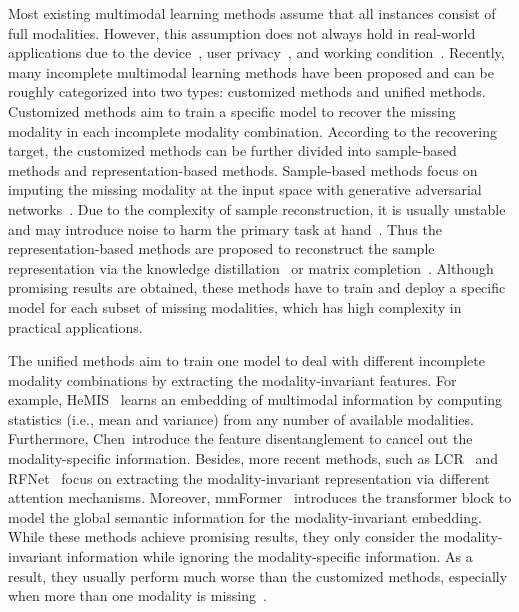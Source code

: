 \documentclass[10pt,twocolumn,letterpaper]{article}
\begin{document}
Most existing multimodal learning methods assume that all instances consist of full modalities. However, this assumption does not always hold in real-world applications due to the device~\cite{spcical-gan1,device1}, user privacy~\cite{privacy1,privacy2}, and working condition~\cite{special-hall1,special-hall2}. Recently, many incomplete multimodal learning methods have been proposed and can be roughly categorized into two types: customized methods and unified methods. Customized methods aim to train a specific model to recover the missing modality in each incomplete modality combination. According to the recovering target, the customized methods can be further divided into sample-based methods and representation-based methods. Sample-based methods focus on imputing the missing modality at the input space with generative adversarial networks~\cite{MC2,MC3,spcical-gan1,special-gan2}. Due to the complexity of sample reconstruction, it is usually unstable and may introduce noise to harm the primary task at hand~\cite{gan-issue1}. Thus the representation-based methods are proposed to reconstruct the sample representation via the knowledge distillation~\cite{special-hall1,special-hall2,special-hall3,special-hall4} or matrix completion~\cite{lmc1,lmc2}. Although promising results are obtained, these methods have to train and deploy a specific model for each subset of missing modalities, which has high complexity in practical applications.

The unified methods aim to train one model to deal with different incomplete modality combinations by extracting the modality-invariant features. For example, HeMIS~\cite{hemis} learns an embedding of multimodal information by computing statistics (i.e., mean and variance) from any number of available modalities. Furthermore, Chen~\etal introduce the feature disentanglement to cancel out the modality-specific information. Besides, more recent methods, such as LCR~\cite{lcr} and RFNet~\cite{rfnet} focus on extracting the modality-invariant representation via different attention mechanisms. Moreover, mmFormer~\cite{mmformer} introduces the transformer block to model the global semantic information for the modality-invariant embedding. While these methods achieve promising results, they only consider the modality-invariant information while ignoring the modality-specific information. As a result, they usually perform much worse than the customized methods, especially when more than one modality is missing~\cite{acn}.
\end{document}
